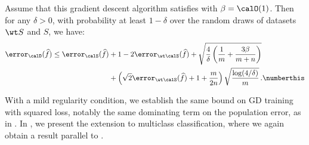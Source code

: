 % 
\begin{theorem}\label{thm:linear}
    Assume that this gradient descent algorithm satisfies 
    with $\beta=\calO(1)$.  
    Then for any $\delta >0$, with probability at least $1-\delta$ 
    over the random draws of datasets $\wt S$ and $S$, we have:
    \begin{align*}
        \error_\calD(\widehat f) \le \error_\calS(\widehat f) &+ 1 - 2 \error_{\wt\calS}(\widehat f) + \sqrt{\frac{4}{\delta}\left(\frac{1}{m} +\frac{3\beta}{m+n} \right)} \\
        & + \left(\sqrt{2}\error_{\wt\calS}(\widehat f) + 1 + \frac{m}{2n} \right) \sqrt{\frac{\log(4/\delta)}{m}} \,. \label{eq:gd_error} \numberthis
    \end{align*} 
\end{theorem}
% 
With a mild regularity condition, 
we establish the same bound 
on GD training with squared loss, 
notably the same dominating term on the population error, 
as in . In , we present the extension to multiclass classification, where we again obtain a result parallel to . 

